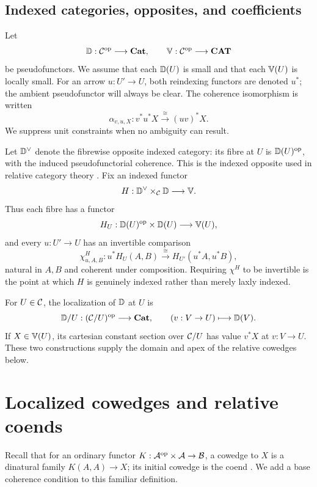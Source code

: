 \subsection{Indexed categories, opposites, and coefficients}
\label{subsec:indexed-data}

Let
\[
  \mathbb{D}:\mathcal{C}^{\mathrm{op}}\longrightarrow\mathbf{Cat},
  \qquad
  \mathbb{V}:\mathcal{C}^{\mathrm{op}}\longrightarrow\mathbf{CAT}
\]
be pseudofunctors.  We assume that each \(\mathbb{D}(U)\) is small and that each
\(\mathbb{V}(U)\) is locally small.  For an arrow \(u:U'\to U\), both reindexing
functors are denoted \(u^*\); the ambient pseudofunctor will always be clear.
The coherence isomorphism is written
\[
  \alpha_{v,u,X}:v^*u^*X\xrightarrow{\ \cong\ }(uv)^*X.
\]
We suppress unit constraints when no ambiguity can result.

Let \(\mathbb{D}^{\vee}\) denote the fibrewise opposite indexed category: its fibre
at \(U\) is \(\mathbb{D}(U)^{\mathrm{op}}\), with the induced pseudofunctorial coherence.
This is the indexed opposite used in relative category theory
\cite[Definition~2.1.4]{CaramelloZanfa2021}.  Fix an indexed functor
\[
  H:\mathbb{D}^{\vee}\times_{\mathcal{C}}\mathbb{D}\longrightarrow\mathbb{V}.
\]
Thus each fibre has a functor
\[
  H_U:\mathbb{D}(U)^{\mathrm{op}}\times\mathbb{D}(U)\longrightarrow\mathbb{V}(U),
\]
and every \(u:U'\to U\) has an invertible comparison
\begin{equation}
  \chi^H_{u,A,B}:u^*H_U(A,B)\xrightarrow{\ \cong\ }
  H_{U'}(u^*A,u^*B),
  \label{eq:H-comparison}
\end{equation}
natural in \(A,B\) and coherent under composition.  Requiring \(\chi^H\) to
be invertible is the point at which \(H\) is genuinely indexed rather than
merely laxly indexed.

For \(U\in\mathcal{C}\), the localization of \(\mathbb{D}\) at \(U\) is
\[
  \mathbb{D}/U:(\mathcal{C}/U)^{\mathrm{op}}\longrightarrow\mathbf{Cat},
  \qquad
  (v:V\to U)\longmapsto\mathbb{D}(V).
\]
If \(X\in\mathbb{V}(U)\), its cartesian constant section over \(\mathcal{C}/U\) has value
\(v^*X\) at \(v:V\to U\).  These two constructions supply the domain and
apex of the relative cowedges below.


\section{Localized cowedges and relative coends}
\label{sec:definition}

Recall that for an ordinary functor \(K:\mathcal A^{\mathrm{op}}\times\mathcal
A\to\mathcal B\), a cowedge to \(X\) is a dinatural family
\(K(A,A)\to X\); its initial cowedge is the coend
\cite[Definition~1.1.4 and Definition~1.1.6]{Loregian2023}.  We add a base
coherence condition to this familiar definition.

